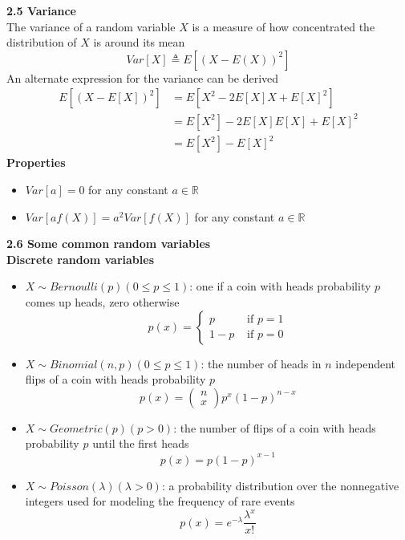 \documentclass[10pt,a4paper,oneside]{beamer}
\begin{document}
\begin{frame}
\vspace{0.1cm}
{\bfseries 2.5 Variance} 
\vspace{0.3cm}
\\The variance of a random variable $X$ is a measure of how concentrated the distribution of $X$ is around its mean
\[
Var[X] \triangleq E\left[(X-E(X))^{2}\right]
\]
An alternate expression for the variance can be derived
\[
\begin{aligned} E\left[(X-E[X])^{2}\right] &=E\left[X^{2}-2 E[X] X+E[X]^{2}\right] \\ &=E\left[X^{2}\right]-2 E[X] E[X]+E[X]^{2} \\ &=E\left[X^{2}\right]-E[X]^{2} \end{aligned}
\]
{\bfseries Properties}
\begin{itemize}
	\item $Var[a]=0$ for any constant $a\in \mathbb{R}$
	\item $Var[af(X)]=a^2Var[f(X)]$ for any constant $a \in \mathbb{R}$
\end{itemize} 
\end{frame}
\begin{frame}
\vspace{0.4cm}
{\bfseries 2.6 Some common random variables} 
\vspace{0.4cm}
\\{\bfseries Discrete random variables} 
\begin{itemize}
	\item $X\sim Bernoulli(p)(0\leqslant p \leqslant1)$: one if a coin with heads probability $p$ comes up heads, zero otherwise
	\[
	p(x)=\left\{\begin{array}{ll}{p} & {\text { if } p=1} \\ {1-p} & {\text { if } p=0}\end{array}\right.
	\]
	\item $X\sim Binomial(n,p)(0\leqslant p \leqslant1)$: the number of heads in $n$ independent flips of a coin with heads probability $p$
	\[
	p(x)=\left( \begin{array}{l}{n} \\ {x}\end{array}\right) p^{x}(1-p)^{n-x}
	\]
\end{itemize} 
\end{frame}
\begin{frame}
\vspace{0.4cm}
\begin{itemize}
	\item $X\sim Geometric(p)(p>0)$: the number of flips of a coin with heads probability $p$ until the first heads
	\[
	p(x)=p(1-p)^{x-1}
	\]
	\item $X\sim Poisson(\lambda)(\lambda>0)$: a probability distribution over the nonnegative integers used for modeling the frequency of rare events
	\[
	p(x)=e^{-\lambda} \frac{\lambda^{x}}{x !}
	\]
\end{itemize} 
\end{frame}
\end{document}
